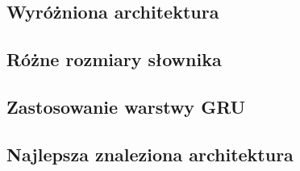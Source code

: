\subsection{Wyróżniona architektura}
\subsection{Różne rozmiary słownika}
\subsection{Zastosowanie warstwy GRU}
\subsection{Najlepsza znaleziona architektura}
